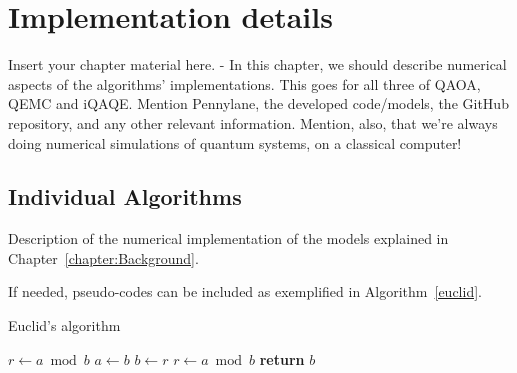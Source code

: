 
\chapter{Implementation details}
\label{chapter:implementation}

Insert your chapter material here. - In this chapter, we should describe numerical aspects of the algorithms' implementations. This goes for all three of QAOA, QEMC and iQAQE. Mention Pennylane, the developed code/models, the GitHub repository, and any other relevant information. Mention, also, that we're always doing numerical simulations of quantum systems, on a classical computer!

\section{Individual Algorithms}
\label{section:Individual_Algorithms}

Description of the numerical implementation of the models explained in Chapter~\ref{chapter:Background}.

If needed, pseudo-codes can be included as exemplified in Algorithm~\ref{euclid}.
%
%
\begin{algorithm}
\caption{Euclid’s algorithm}\label{euclid}
\begin{algorithmic}[1]
   \State $r\gets a\bmod b$
      \State $a\gets b$
      \State $b\gets r$
      \State $r\gets a\bmod b$
   \EndWhile\label{euclidendwhile}
   \State \textbf{return} $b$
\EndProcedure
\end{algorithmic}
\end{algorithm}


